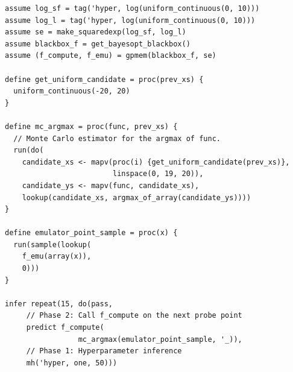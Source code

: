 \documentclass{article} %
\newcommand{\gpmem}{\texttt{gpmem}}
\begin{document}
\begin{minipage}{\linewidth}
\small
\belowcaptionskip=-10pt
\begin{lstlisting}[float,frame=single,caption={
  Code for Bayesian optimization using \gpmem.
  %The procedure \texttt{V\_compute} probes \texttt{V} directly, thus improving the GP model \texttt{V\_emu}.
  %(\texttt{V\_emu\_pointwise} is simply a shortcut for sampling the GP model at a single point; \texttt{V\_emu} is more general, allowing joint samples to be taken at any set of points.)
  In the loop, \texttt{V\_compute} is called to probe the value of \texttt{V} at a new argument.
  The new argument, \texttt{(mc\_argmax V\_emu\_pointwise mc\_sampler)}, is a Monte Carlo estimate of the maximum pointwise sample of \texttt{V\_emu} (itself a stochastic quantity), with the Monte Carlo samples being drawn in this case uniformly between $-20$ and $20$.
  After each new call to \texttt{V\_compute}, the Metropolis--Hastings algorithm is used to perform inference on the hyperparameters of the covariance function in the GP model in light of the new conditioning data.
  Once enough calls to \texttt{V\_compute} have been made (in our case we stopped at 15 calls), we can inspect the full list of probed $(a,r)$ pairs with \texttt{extract\_stats}.
  The answer to our maximization problem is simply the pair having the highest $r$; but our algorithm also learns more potentially useful information.
},mathescape,label=alg:bayesopt]
assume log_sf = tag('hyper, log(uniform_continuous(0, 10)))
assume log_l = tag('hyper, log(uniform_continuous(0, 10)))
assume se = make_squaredexp(log_sf, log_l)
assume blackbox_f = get_bayesopt_blackbox()
assume (f_compute, f_emu) = gpmem(blackbox_f, se)

define get_uniform_candidate = proc(prev_xs) {
  uniform_continuous(-20, 20)
}

define mc_argmax = proc(func, prev_xs) {
  // Monte Carlo estimator for the argmax of func.
  run(do(
    candidate_xs <- mapv(proc(i) {get_uniform_candidate(prev_xs)},
                         linspace(0, 19, 20)),
    candidate_ys <- mapv(func, candidate_xs),
    lookup(candidate_xs, argmax_of_array(candidate_ys))))
}

define emulator_point_sample = proc(x) {
  run(sample(lookup(
    f_emu(array(x)),
    0)))
}

infer repeat(15, do(pass,
     // Phase 2: Call f_compute on the next probe point
     predict f_compute(
                 mc_argmax(emulator_point_sample, '_)),
     // Phase 1: Hyperparameter inference
     mh('hyper, one, 50)))
\end{lstlisting}
\end{minipage}
      
\end{document}
